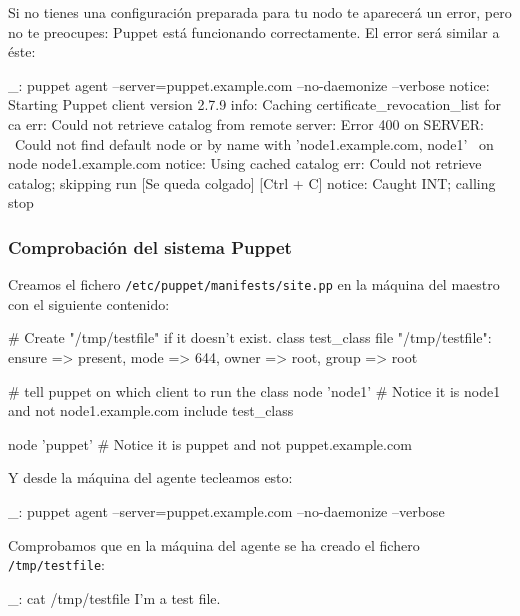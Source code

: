 Si no tienes una configuración preparada para tu nodo te aparecerá un error, pero no te preocupes: Puppet está funcionando correctamente. El error será similar a éste:

\begin{bashcode}
_: puppet agent --server=puppet.example.com --no-daemonize --verbose
notice: Starting Puppet client version 2.7.9
info: Caching certificate_revocation_list for ca
err: Could not retrieve catalog from remote server: Error 400 on SERVER: \
Could not find default node or by name with 'node1.example.com, node1' \
on node node1.example.com
notice: Using cached catalog
err: Could not retrieve catalog; skipping run
[Se queda colgado]
[Ctrl + C]
notice: Caught INT; calling stop
\end{bashcode}


\subsubsection{Comprobación del sistema Puppet}

Creamos el fichero \texttt{/etc/puppet/manifests/site.pp} en la máquina del maestro con el siguiente contenido:

\begin{rubycode}
# Create "/tmp/testfile" if it doesn't exist.
class test_class {
    file { "/tmp/testfile":
       ensure => present,
       mode   => 644,
       owner  => root,
       group  => root
    }
}

# tell puppet on which client to run the class
node 'node1' {            # Notice it is node1 and not node1.example.com
    include test_class
}

node 'puppet' {           # Notice it is puppet and not puppet.example.com
}
\end{rubycode}

Y desde la máquina del agente tecleamos esto:

\begin{bashcode}
_: puppet agent --server=puppet.example.com --no-daemonize --verbose
\end{bashcode}

Comprobamos que en la máquina del agente se ha creado el fichero \texttt{/tmp/testfile}:

\begin{bashcode}
_: cat /tmp/testfile
I'm a test file.
\end{bashcode}


